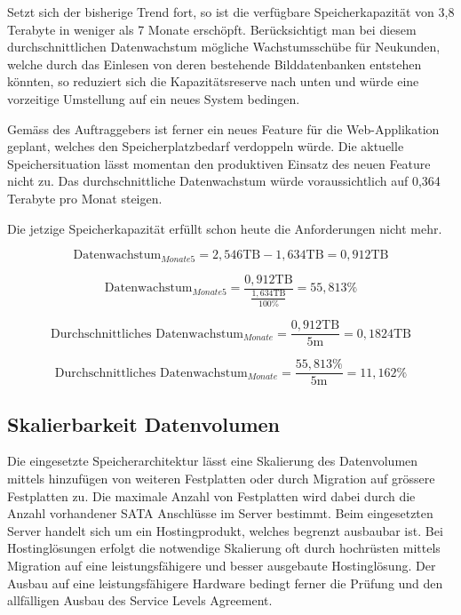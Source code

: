 Setzt sich der bisherige Trend fort, so ist die verfügbare Speicherkapazität von 3,8 Terabyte in weniger als 7 Monate erschöpft. Berücksichtigt man bei diesem durchschnittlichen Datenwachstum mögliche Wachstumsschübe für Neukunden, welche durch das Einlesen von deren bestehende Bilddatenbanken entstehen könnten, so reduziert sich die Kapazitätsreserve nach unten und würde eine vorzeitige Umstellung auf ein neues System bedingen.

Gemäss des Auftraggebers ist ferner ein neues Feature für die Web-Applikation geplant, welches den Speicherplatzbedarf verdoppeln würde. Die aktuelle Speichersituation lässt momentan den produktiven Einsatz des neuen Feature nicht zu. Das durchschnittliche Datenwachstum würde voraussichtlich auf 0,364 Terabyte pro Monat steigen.

Die jetzige Speicherkapazität erfüllt schon heute die Anforderungen nicht mehr.

\begin{equation}
\mbox{Datenwachstum}_{Monate5} = 2,546  \mathrm{TB} - 1,634 \mathrm{TB} =  0,912 \mathrm{TB}
\label{eqn:Verfügbarkeit_5Monate}
\end{equation}

\begin{equation}
\mbox{Datenwachstum}_{Monate5} = \frac{0,912 \mathrm{TB}}{\frac{1,634 \mathrm{TB}}{100 \%}} =  55,813\%
\label{eqn:Verfügbarkeit_5Monate_in_Prozent}
\end{equation}

\begin{equation}
\mbox{Durchschnittliches Datenwachstum}_{Monate} = \frac{0,912 \mathrm{TB}}{5\mathrm{m}} =  0,1824 \mathrm{TB}
\label{eqn:Verfügbarkeit_1Monate}
\end{equation}

\begin{equation}
\mbox{Durchschnittliches Datenwachstum}_{Monate} = \frac{55,813\%}{5 \mathrm{m}} = 11,162\%
\label{eqn:Verfügbarkeit_1Monate_in_Prozent}
\end{equation}

\subsection{Skalierbarkeit Datenvolumen}\label{AnalyseSkalierbarkeitDatenvolumen}
Die eingesetzte Speicherarchitektur lässt eine Skalierung des Datenvolumen mittels hinzufügen von weiteren Festplatten oder durch Migration auf grössere Festplatten zu. Die maximale Anzahl von Festplatten wird dabei durch die Anzahl vorhandener SATA Anschlüsse im Server bestimmt. Beim eingesetzten Server handelt sich um ein Hostingprodukt, welches begrenzt ausbaubar ist. Bei Hostinglösungen erfolgt die notwendige Skalierung oft durch hochrüsten mittels Migration auf eine leistungsfähigere und besser ausgebaute Hostinglösung. Der Ausbau auf eine leistungsfähigere Hardware bedingt ferner die Prüfung und den allfälligen Ausbau des Service Levels Agreement. 

